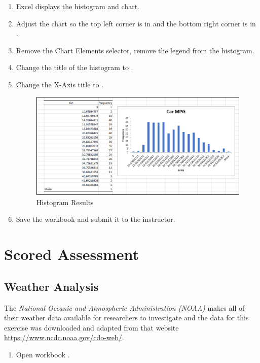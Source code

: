 \begin{enumerate}[resume]
	\item Excel displays the histogram and chart. 
	\item Adjust the chart so the top left corner is in  and the bottom right corner is in .
	\item Remove the Chart Elements selector, remove the legend from the histogram.
	\item Change the title of the histogram to .
	\item Change the X-Axis title to .

	\begin{figure}[H]
		\centering
		\includegraphics[width=\maxwidth{.95\linewidth}]{gfx/ch09_fig77}
		\caption{Histogram Results}
		\label{09:fig77}
	\end{figure}
	
	\item Save the  workbook and submit it to the instructor.

\end{enumerate}


\section{Scored Assessment}

\subsection{Weather Analysis}

The \textit{National Oceanic and Atmospheric Administration (NOAA)} makes all of their weather data available for researchers to investigate and the data for this exercise was downloaded and adapted from that website \url{https://www.ncdc.noaa.gov/cdo-web/}.

\begin{enumerate}
	\item Open workbook .
\end{enumerate}

